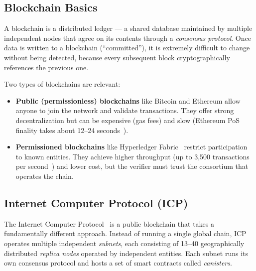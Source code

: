 \documentclass[conference]{IEEEtran}
\begin{document}
\subsection{Blockchain Basics}

A blockchain is a distributed ledger — a shared database maintained by multiple independent nodes that agree on its contents through a \emph{consensus protocol}. Once data is written to a blockchain (``committed''), it is extremely difficult to change without being detected, because every subsequent block cryptographically references the previous one.

Two types of blockchains are relevant:
\begin{itemize}[leftmargin=*]
  \item \textbf{Public (permissionless) blockchains} like Bitcoin and Ethereum allow anyone to join the network and validate transactions. They offer strong decentralization but can be expensive (gas fees) and slow (Ethereum PoS finality takes about 12--24 seconds~\cite{buterin2020eth2}).
  \item \textbf{Permissioned blockchains} like Hyperledger Fabric~\cite{androulaki2018fabric} restrict participation to known entities. They achieve higher throughput (up to 3,500 transactions per second~\cite{sharmaperformance2019}) and lower cost, but the verifier must trust the consortium that operates the chain.
\end{itemize}

\subsection{Internet Computer Protocol (ICP)}
\label{subsec:icp}

The Internet Computer Protocol~\cite{hanke2018dfinity,dfinity2022geeks} is a public blockchain that takes a fundamentally different approach. Instead of running a single global chain, ICP operates multiple independent \emph{subnets}, each consisting of 13--40 geographically distributed \emph{replica nodes} operated by independent entities. Each subnet runs its own consensus protocol and hosts a set of smart contracts called \emph{canisters}.
\end{document}

